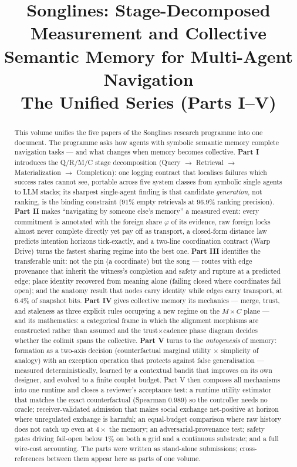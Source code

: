 \documentclass{article}
\title{Songlines: Stage-Decomposed Measurement and Collective
Semantic Memory for Multi-Agent Navigation\\
\large The Unified Series (Parts I--V)}
\begin{document}
\maketitle
\begin{abstract}
This volume unifies the five papers of the Songlines research
programme into one document. The programme asks how agents with
symbolic semantic memory complete navigation tasks --- and what
changes when memory becomes collective. \textbf{Part I} introduces the
Q/R/M/C stage decomposition (Query $\to$ Retrieval $\to$
Materialization $\to$ Completion): one logging contract that
localises failures which success rates cannot see, portable across
five system classes from symbolic single agents to LLM stacks; its
sharpest single-agent finding is that candidate \emph{generation},
not ranking, is the binding constraint ($91\%$ empty retrievals at
$96.9\%$ ranking precision). \textbf{Part II} makes ``navigating by
someone else's memory'' a measured event: every commitment is
annotated with the foreign share $\varphi$ of its evidence, raw
foreign locks almost never complete directly yet pay off as
transport, a closed-form distance law predicts intention horizons
tick-exactly, and a two-line coordination contract (Warp Drive) turns
the fastest sharing regime into the best one. \textbf{Part III}
identifies the transferable unit: not the pin (a coordinate) but the
song --- routes with edge provenance that inherit the witness's
completion and safety and rupture at a predicted edge; place identity
recovered from meaning alone (failing closed where coordinates fail
open); and the anatomy result that nodes carry identity while edges
carry transport, at $6.4\%$ of snapshot bits. \textbf{Part IV} gives
collective memory its mechanics --- merge, trust, and staleness as
three explicit rules occupying a new regime on the
$M{\times}C$ plane --- and its mathematics: a categorical frame in
which the alignment morphisms are constructed rather than assumed and
the trust$\times$cadence phase diagram decides whether the colimit
spans the collective. \textbf{Part V} turns to the
\emph{ontogenesis} of memory: formation as a two-axis decision
(counterfactual marginal utility $\times$ simplicity of analogy) with
an exception operation that protects against false generalisation ---
measured deterministically, learned by a contextual bandit that
improves on its own designer, and evolved to a finite couplet budget.
Part V then composes all mechanisms into one runtime and closes a
reviewer's acceptance test: a runtime utility estimator that matches
the exact counterfactual (Spearman $0.989$) so the controller needs
no oracle; receiver-validated admission that makes social exchange
net-positive at horizon where unregulated exchange is harmful; an
equal-budget comparison where raw history does not catch up even at
$4\times$ the memory; an adversarial-provenance test; safety gates
driving fail-open below $1\%$ on both a grid and a continuous
substrate; and a full wire-cost accounting. The parts were written as
stand-alone submissions; cross-references between them appear here as
parts of one volume.
\end{abstract}
\end{document}
